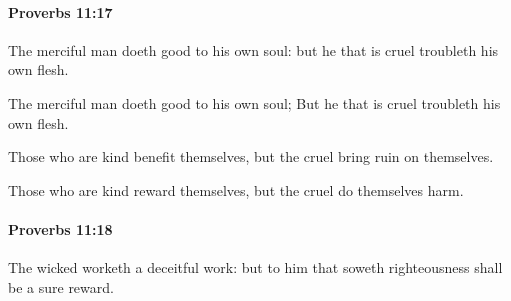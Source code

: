 		\paragraph{Proverbs 11:17} %
			\label{PROVERBS-11-17}

			The merciful man doeth good to his own soul: but he that is cruel troubleth his own flesh.

			\begin{versebox}
					\item[BHS] 
					\item[ASV] The merciful man doeth good to his own soul; But he that is cruel troubleth his own flesh.
					\item[NIV] Those who are kind benefit themselves, but the cruel bring ruin on themselves.
					\item[NRSV] Those who are kind reward themselves, but the cruel do themselves harm.
			\end{versebox}

		\paragraph{Proverbs 11:18} %
			\label{PROVERBS-11-18}

			The wicked worketh a deceitful work: but to him that soweth righteousness shall be a sure reward.

